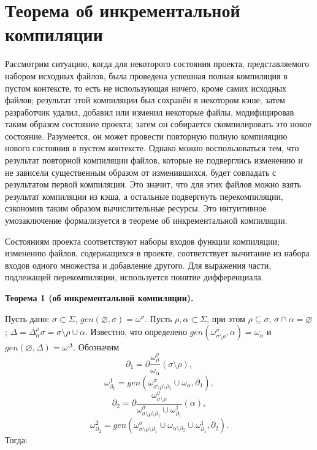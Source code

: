 \section{Теорема об инкрементальной компиляции}

Рассмотрим ситуацию, когда для некоторого состояния проекта, представляемого набором исходных файлов, была проведена успешная полная компиляция в пустом контексте, то есть не использующая ничего, кроме самих исходных файлов; результат этой компиляции был сохранён в некотором кэше; затем разработчик удалил, добавил или изменил некоторые файлы, модифицировав таким образом состояние проекта; затем он собирается скомпилировать это новое состояние. Разумеется, он может провести повторную полную компиляцию нового состояния в пустом контексте. Однако можно воспользоваться тем, что результат повторной компиляции файлов, которые не подверглись изменению и не зависели существенным образом от изменившихся, будет совпадать с результатом первой компиляции. Это значит, что для этих файлов можно взять результат компиляции из кэша, а остальные подвергнуть перекомпиляции, сэкономив таким образом вычислительные ресурсы. Это интуитивное умозаключение формализуется в теореме об инкрементальной компиляции.

Состояниям проекта соответствуют наборы входов функции компиляции; изменению файлов, содержащихся в проекте, соответствует вычитание из набора входов одного множества и добавление другого. Для выражения части, подлежащей перекомпиляции, используется понятие дифференциала.\\

\newcommand{\butpartial}{{\sigma\setminus\rho\setminus\partial_1}}
\newcommand{\butpartialA}{{\alpha\setminus{\partial_2}}}
\newcommand{\sigmanoro}{{\sigma\setminus\rho}}

\textbf{Теорема 1 (об инкрементальной компиляции).}

Пусть дано: $\sigma \subset \Sigma$, $gen(\varnothing, \sigma) = \omega^\sigma$.
Пусть $\rho, \alpha \subset \Sigma$, при этом $\rho \subseteq \sigma$, $\sigma \cap \alpha = \varnothing$; $\Delta = \Delta^\rho_\alpha\sigma = \sigma\setminus\rho\cup\alpha$.
Известно, что определено $gen(\omega^\sigma_{\sigma\setminus\rho}, \alpha) = \omega_\alpha$ и $gen(\varnothing, \Delta) = \omega^\Delta$.
Обозначим 
$$\partial_1 = \partial\dfrac{\omega^\sigma_\rho}{\omega_\alpha}(\sigma\setminus\rho),$$
$$\omega^1_{\partial_1} = gen(\omega^\sigma_{\butpartial} \cup \omega_\alpha, \partial_1),$$
$$\partial_2 = \partial\dfrac{\omega^\sigma_{\sigma\setminus\rho}}{\omega^\sigma_{\butpartial} \cup \omega^1_{\partial_1}}(\alpha),$$
$$\omega^2_{\partial_2} = gen(\omega^\sigma_{\butpartial} \cup \omega_{\butpartialA} \cup \omega^1_{\partial_1}, \partial_2).$$
Тогда:

